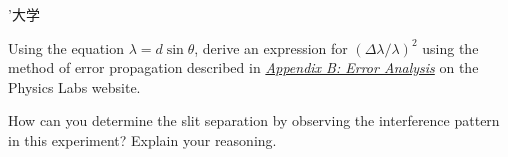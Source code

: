 ’大学\documentclass[addpoints]{physlabs}
\date{\today}
\begin{document}
\maketitle

\begin{prelab}

    \filbreak
    \question[1] Using the equation $\lambda=d\sin{\theta}$, derive an expression for $(\Delta\lambda/\lambda)^2$ using the method of error propagation described in \href{https://www.pas.rochester.edu/%7Ephyslabs/manuals/AppendixB.pdf}{\textsl{Appendix B: Error Analysis}} on the Physics Labs website.
    \begin{solution}[7cm]
        
    \end{solution}

    \filbreak
    \question[1] How can you determine the slit separation by observing the interference pattern in this experiment? Explain your reasoning.
    \begin{solution}[3cm]
        
    \end{solution}
    
\end{prelab}
\end{document}
